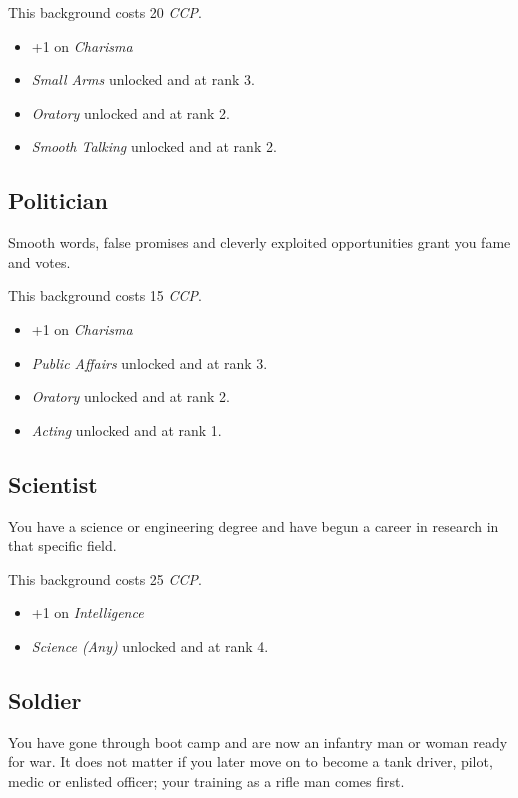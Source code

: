This background costs 20 \emph{CCP}.

\begin{itemize}
\item +1 on \emph{Charisma}
\item \emph{Small Arms} unlocked and at rank 3.
\item \emph{Oratory} unlocked and at rank 2.
\item \emph{Smooth Talking} unlocked and at rank 2.
\end{itemize}

\subsection{Politician}

Smooth words, false promises and cleverly exploited opportunities grant you fame
and votes.

This background costs 15 \emph{CCP}.

\begin{itemize}
\item +1 on \emph{Charisma}
\item \emph{Public Affairs} unlocked and at rank 3.
\item \emph{Oratory} unlocked and at rank 2.
\item \emph{Acting} unlocked and at rank 1.
\end{itemize}

\subsection{Scientist}

You have a science or engineering degree and have begun a career in research in
that specific field.

This background costs 25 \emph{CCP}.

\begin{itemize}
\item +1 on \emph{Intelligence}
\item \emph{Science (Any)} unlocked and at rank 4.
\end{itemize}

\subsection{Soldier}

You have gone through boot camp and are now an infantry man or woman ready for
war. It does not matter if you later move on to become a tank driver, pilot,
medic or enlisted officer; your training as a rifle man comes first.

